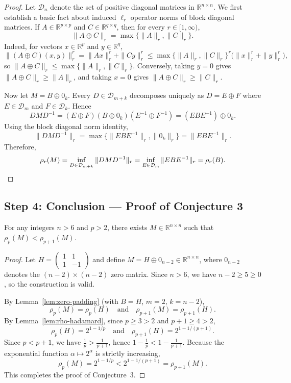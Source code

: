 \documentclass{article}
\begin{document}
\begin{proof}
Let $\mathcal{D}_n$ denote the set of positive diagonal matrices in $\mathbb{R}^{n \times n}$. We first establish a basic fact about induced $\ell_r$ operator norms of block diagonal matrices. If $A \in \mathbb{R}^{p \times p}$ and $C \in \mathbb{R}^{q \times q}$, then for every $r \in [1,\infty)$,
\[
\|A \oplus C\|_r=\max\{\|A\|_r,\|C\|_r\}.
\]
Indeed, for vectors $x \in \mathbb{R}^p$ and $y \in \mathbb{R}^q$,
\[
\|(A \oplus C)(x,y)\|_r^r = \|Ax\|_r^r+\|Cy\|_r^r \le \max\{\|A\|_r,\|C\|_r\}^r\bigl(\|x\|_r^r+\|y\|_r^r\bigr),
\]
so $\|A \oplus C\|_r \le \max\{\|A\|_r,\|C\|_r\}$. Conversely, taking $y=0$ gives $\|A \oplus C\|_r \ge \|A\|_r$, and taking $x=0$ gives $\|A \oplus C\|_r \ge \|C\|_r$.

Now let $M=B \oplus 0_k$. Every $D \in \mathcal{D}_{m+k}$ decomposes uniquely as $D=E \oplus F$ where $E \in \mathcal{D}_m$ and $F \in \mathcal{D}_k$. Hence
\[
DMD^{-1} = (E \oplus F)(B \oplus 0_k)(E^{-1}\oplus F^{-1}) = (EBE^{-1}) \oplus 0_k.
\]
Using the block diagonal norm identity,
\[
\|DMD^{-1}\|_r = \max\{\|EBE^{-1}\|_r,\|0_k\|_r\} = \|EBE^{-1}\|_r.
\]
Therefore,
\[
\rho_r(M) = \inf_{D \in \mathcal{D}_{m+k}} \|DMD^{-1}\|_r = \inf_{E \in \mathcal{D}_m} \|EBE^{-1}\|_r = \rho_r(B). \qedhere
\]
\end{proof}


\subsection*{Step 4: Conclusion --- Proof of Conjecture 3}

\begin{theorem}\label{thm:conj3}
For any integers $n > 6$ and $p > 2$, there exists $M \in \mathbb{R}^{n \times n}$ such that $\rho_p(M) < \rho_{p+1}(M)$.
\end{theorem}

\begin{proof}
Let $H = \begin{pmatrix} 1 & 1 \\ 1 & -1 \end{pmatrix}$ and define $M = H \oplus 0_{n-2} \in \mathbb{R}^{n \times n}$, where $0_{n-2}$ denotes the $(n-2)\times(n-2)$ zero matrix. Since $n > 6$, we have $n-2 \geq 5 \geq 0$, so the construction is valid.

By Lemma~\ref{lem:zero-padding} (with $B=H$, $m=2$, $k=n-2$),
\[
\rho_p(M) = \rho_p(H) \quad\text{and}\quad \rho_{p+1}(M) = \rho_{p+1}(H).
\]
By Lemma~\ref{lem:rho-hadamard}, since $p \geq 3 > 2$ and $p+1 \geq 4 > 2$,
\[
\rho_p(H) = 2^{1-1/p} \quad\text{and}\quad \rho_{p+1}(H) = 2^{1-1/(p+1)}.
\]
Since $p < p+1$, we have $\frac{1}{p} > \frac{1}{p+1}$, hence $1 - \frac{1}{p} < 1 - \frac{1}{p+1}$. Because the exponential function $\alpha \mapsto 2^\alpha$ is strictly increasing,
\[
\rho_p(M) = 2^{1-1/p} < 2^{1-1/(p+1)} = \rho_{p+1}(M).
\]
This completes the proof of Conjecture~3.
\end{proof}
\end{document}
